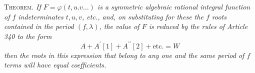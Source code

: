 \textsc{Theorem.} \textit{If \(F=\varphi(t,\allowbreak u.v\ldots)\) is a symmetric algebraic} \textit{rational integral function of \(f\) indeterminates \(t,\allowbreak u,\allowbreak v\), etc., and, on substituting for these the \(f\) roots contained in the period \((f,\allowbreak \lambda)\), the value of \(F\) is reduced by the rules of Article 340 to the form} \[A+A^{\prime}[1]+A^{\prime\prime}[2]+\text{etc.}=W\] \textit{then the roots in this expression that belong to any one and the same period of \(f\) terms will have equal coefficients.}

